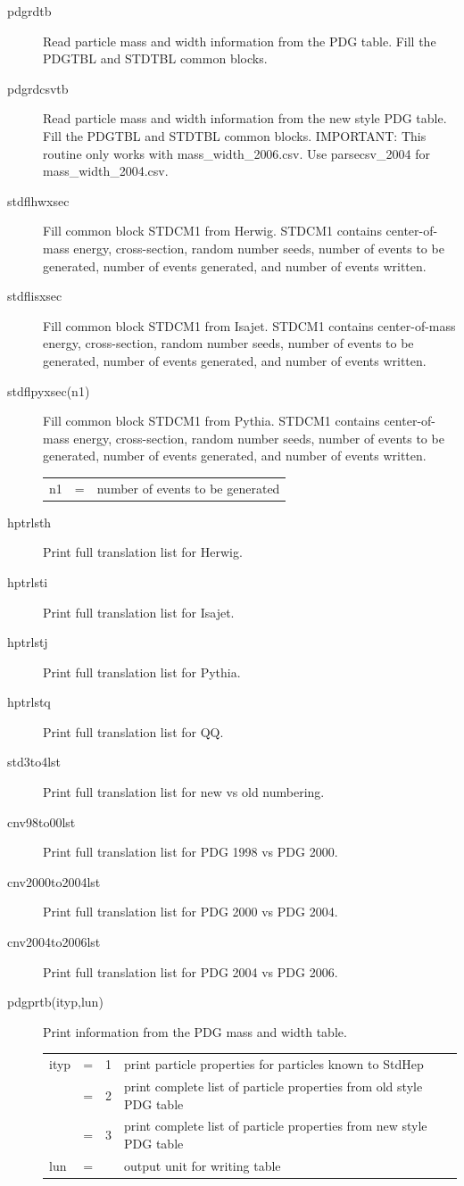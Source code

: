 \begin{description}
\item[pdgrdtb]
  Read particle mass and width information from the PDG table.
  Fill the PDGTBL and STDTBL common blocks.
\item[pdgrdcsvtb]
  Read particle mass and width information from the new style PDG table.
  Fill the PDGTBL and STDTBL common blocks.
  IMPORTANT: This routine only works with mass\_width\_2006.csv.
  Use parsecsv\_2004 for mass\_width\_2004.csv.
\item[stdflhwxsec] Fill common block STDCM1 from Herwig.
  STDCM1 contains center-of-mass energy, cross-section, random number
  seeds, number of events to be generated, number of events generated,
  and number of events written.
\item[stdflisxsec] Fill common block STDCM1 from Isajet.
  STDCM1 contains center-of-mass energy, cross-section, random number
  seeds, number of events to be generated, number of events generated,
  and number of events written.
\item[stdflpyxsec(n1)] Fill common block STDCM1 from Pythia.
  STDCM1 contains center-of-mass energy, cross-section, random number
  seeds, number of events to be generated, number of events generated,
  and number of events written.

\begin{tabular}{lcl}
n1 & = & number of events to be generated \\
\end{tabular}

\item[hptrlsth] Print full translation list for Herwig.
\item[hptrlsti] Print full translation list for Isajet.
\item[hptrlstj] Print full translation list for Pythia.
\item[hptrlstq] Print full translation list for QQ.
\item[std3to4lst] Print full translation list for new vs old numbering.
\item[cnv98to00lst] Print full translation list for PDG 1998 vs PDG 2000.
\item[cnv2000to2004lst] Print full translation list for PDG 2000 vs PDG 2004.
\item[cnv2004to2006lst] Print full translation list for PDG 2004 vs PDG 2006.

\item[pdgprtb(ityp,lun)] Print information from the PDG mass and width table.

\begin{tabular}{lcll}
ityp & = & 1 & print particle properties for particles known to StdHep \\
     & = & 2 & print complete list of particle properties from old style PDG table \\
     & = & 3 & print complete list of particle properties from new style PDG table \\
lun  & = &   & output unit for writing table \\
\end{tabular}


\end{description}
